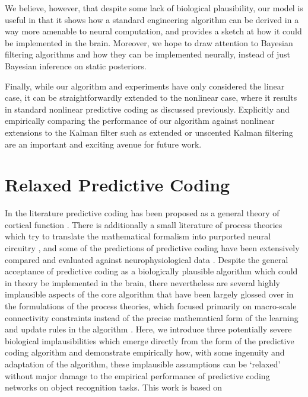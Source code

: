 We believe, however, that despite some lack of biological plausibility, our model is useful in that it shows how a standard engineering algorithm can be derived in a way more amenable to neural computation, and provides a sketch at how it could be implemented in the brain. Moreover, we hope to draw attention to Bayesian filtering algorithms and how they can be implemented neurally, instead of just Bayesian inference on static posteriors. 

Finally, while our algorithm and experiments have only considered the linear case, it can be straightforwardly extended to the nonlinear case, where it results in standard nonlinear predictive coding as discussed previously. Explicitly and empirically comparing the performance of our algorithm against nonlinear extensions to the Kalman filter such as extended or unscented \citep{wan2000unscented} Kalman filtering are an important and exciting avenue for future work.


\section{Relaxed Predictive Coding}

In the literature predictive coding has been proposed as a general theory of cortical function \citep{friston2003learning,friston2005theory,friston2008hierarchical,kanai2015cerebral,spratling2008reconciling}. There is additionally a small literature of process theories which try to translate the mathematical formalism into purported neural circuitry \citep{bastos2012canonical,keller2018predictive,kanai2015cerebral}, and some of the predictions of predictive coding have been extensively compared and evaluated against neurophysiological data \citep{walsh2020evaluating,friston2008hierarchical,huang2011predictive,clark2015surfing,aitchison2017or}. Despite the general acceptance of predictive coding as a biologically plausible algorithm which could in theory be implemented in the brain, there nevertheless are several highly implausible aspects of the core algorithm that have been largely glossed over in the formulations of the process theories, which focused primarily on macro-scale connectivity constraints instead of the precise mathematical form of the learning and update rules in the algorithm \citep{bastos2012canonical}. Here, we introduce three potentially severe biological implausibilities which emerge directly from the form of the predictive coding algorithm and demonstrate empirically how, with some ingenuity and adaptation of the algorithm, these implausible assumptions can be `relaxed' without major damage to the empirical performance of predictive coding networks on object recognition tasks. This work is based on \citep{millidge2020relaxing}

